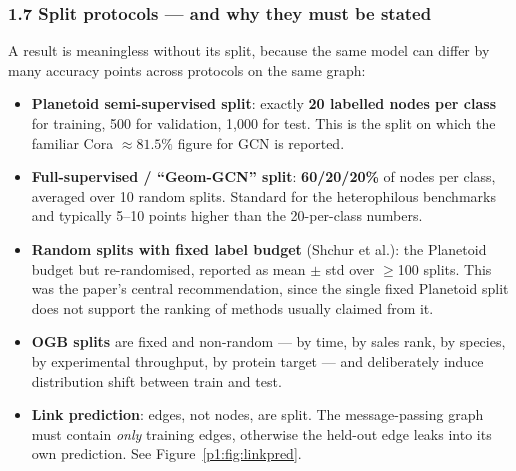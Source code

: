 \subsubsection*{1.7 Split protocols --- and why they must be stated}

A result is meaningless without its split, because the same model can differ by many
accuracy points across protocols on the same graph:

\begin{itemize}[label=$\bullet$,noitemsep,topsep=2pt]
  \item \textbf{Planetoid semi-supervised split}: exactly \textbf{20 labelled nodes per
        class} for training, 500 for validation, 1{,}000 for test. This is the split on
        which the familiar Cora $\approx 81.5\%$ figure for GCN is reported.
  \item \textbf{Full-supervised / ``Geom-GCN'' split}: \textbf{60/20/20\%} of nodes per
        class, averaged over 10 random splits. Standard for the heterophilous benchmarks
        and typically 5--10 points higher than the 20-per-class numbers.
  \item \textbf{Random splits with fixed label budget} (Shchur et al.): the Planetoid
        budget but re-randomised, reported as mean $\pm$ std over $\geq$100 splits. This
        was the paper's central recommendation, since the single fixed Planetoid split
        does not support the ranking of methods usually claimed from it.
  \item \textbf{OGB splits} are fixed and non-random --- by time, by sales rank, by species,
        by experimental throughput, by protein target --- and deliberately induce
        distribution shift between train and test.
  \item \textbf{Link prediction}: edges, not nodes, are split. The message-passing graph
        must contain \emph{only} training edges, otherwise the held-out edge leaks into its
        own prediction. See Figure~\ref{p1:fig:linkpred}.
\end{itemize}

